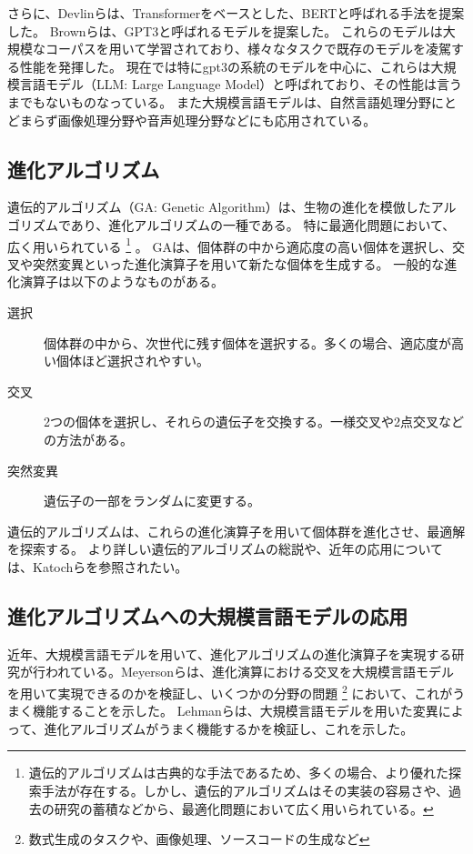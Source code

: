 \documentclass[a4paper,11pt]{jreport}
\begin{document}
さらに、Devlinら\cite{devlin2019bert}は、Transformerをベースとした、BERTと呼ばれる手法を提案した。
Brownら\cite{gpt3}は、GPT3と呼ばれるモデルを提案した。
これらのモデルは大規模なコーパスを用いて学習されており、様々なタスクで既存のモデルを凌駕する性能を発揮した。
現在では特にgpt3の系統のモデルを中心に、これらは大規模言語モデル（LLM: Large Language Model）と呼ばれており、その性能は言うまでもないものなっている。
また大規模言語モデルは、自然言語処理分野にとどまらず画像処理分野や音声処理分野などにも応用されている。

\subsection{進化アルゴリズム}

遺伝的アルゴリズム（GA: Genetic Algorithm）\cite{genetic-algorithm, vose1999simple}は、生物の進化を模倣したアルゴリズムであり、進化アルゴリズムの一種である。
特に最適化問題において、広く用いられている
\footnote{遺伝的アルゴリズムは古典的な手法であるため、多くの場合、より優れた探索手法が存在する。しかし、遺伝的アルゴリズムはその実装の容易さや、過去の研究の蓄積などから、最適化問題において広く用いられている。}
。
GAは、個体群の中から適応度の高い個体を選択し、交叉や突然変異といった進化演算子を用いて新たな個体を生成する。
一般的な進化演算子は以下のようなものがある。
\begin{description}
  \item[選択]
  個体群の中から、次世代に残す個体を選択する。多くの場合、適応度が高い個体ほど選択されやすい。
  \item[交叉] 2つの個体を選択し、それらの遺伝子を交換する。一様交叉や2点交叉などの方法がある。
  \item[突然変異] 遺伝子の一部をランダムに変更する。
\end{description}
遺伝的アルゴリズムは、これらの進化演算子を用いて個体群を進化させ、最適解を探索する。
より詳しい遺伝的アルゴリズムの総説や、近年の応用については、Katochら\cite{katoch2021review}を参照されたい。

\subsection{進化アルゴリズムへの大規模言語モデルの応用}

近年、大規模言語モデルを用いて、進化アルゴリズムの進化演算子を実現する研究が行われている。Meyersonら\cite{meyerson2023language}は、進化演算における交叉を大規模言語モデルを用いて実現できるのかを検証し、いくつかの分野の問題
\footnote{数式生成のタスクや、画像処理、ソースコードの生成など}
において、これがうまく機能することを示した。
Lehmanら\cite{lehman2022evolution}は、大規模言語モデルを用いた変異によって、進化アルゴリズムがうまく機能するかを検証し、これを示した。
\end{document}
